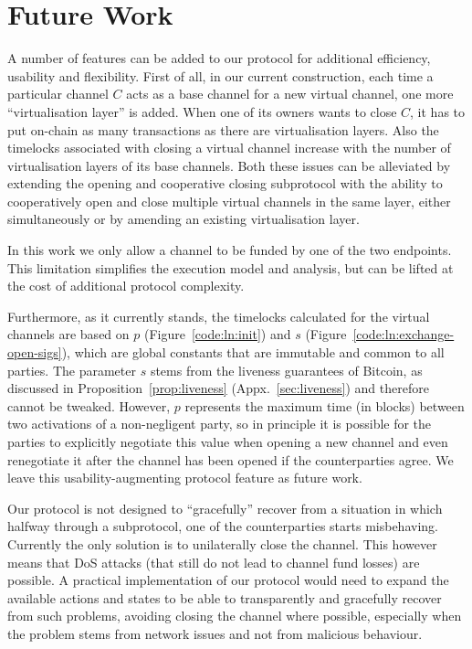 \section{Future Work}
\label{sec:extra-future-work}
  A number of features can be added to our protocol for additional efficiency,
  usability and flexibility. First of all, in our current construction, each
  time a particular channel $C$ acts as a base
  channel for a new virtual channel, one more ``virtualisation layer'' is added. When
  one of its owners wants to close $C$, it has to put on-chain as many
  transactions as there are virtualisation layers. Also the timelocks associated
  with closing a virtual channel increase with the number of virtualisation
  layers of its base channels. Both these issues can be alleviated by extending
  the opening and cooperative closing subprotocol with the ability to
  cooperatively open and close multiple virtual channels in the same layer,
  either simultaneously or by amending an existing virtualisation layer.

  In this work we only allow a channel to be funded by one of the two endpoints.
  This limitation simplifies the execution model and analysis, but can be lifted
  at the cost of additional protocol complexity.

  Furthermore, as it currently stands, the
  timelocks calculated for the virtual channels are based on $p$
  (Figure~\ref{code:ln:init}) and $s$ (Figure~\ref{code:ln:exchange-open-sigs}),
  which are global constants that are immutable and common to all parties. The
  parameter $s$ stems from the liveness guarantees of Bitcoin, as discussed in
  Proposition~\ref{prop:liveness} (Appx.~\ref{sec:liveness}) and therefore cannot be tweaked. However, $p$
  represents the maximum time (in blocks) between two activations of a
  non-negligent party, so in principle it is possible for the parties to
  explicitly negotiate this value when opening a new channel and even
  renegotiate it after the channel has been opened if the counterparties agree.
  We leave this usability-augmenting protocol feature as future work.

  Our protocol is not designed to ``gracefully'' recover from a situation in
  which halfway through a subprotocol, one of the counterparties starts
  misbehaving. Currently the only solution is to unilaterally close the channel.
  This however means that DoS attacks (that still do not lead to channel fund
  losses) are possible. A practical implementation of our protocol would need to
  expand the available actions and states to be able to transparently and
  gracefully recover from such problems, avoiding closing the channel where
  possible, especially when the problem stems from network issues and not from
  malicious behaviour.

